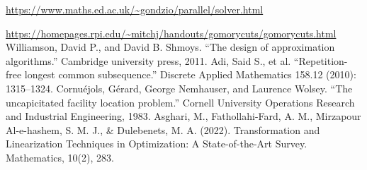 \documentclass[a4paper, utf8, 11pt, colorlinks]{book}
\theoremstyle{definition}
\begin{document}
\begin{thebibliography}{widest entry}
      \url{https://www.maths.ed.ac.uk/~gondzio/parallel/solver.html}
   
     \url{https://homepages.rpi.edu/~mitchj/handouts/gomorycuts/gomorycuts.html}
     Williamson, David P., and David B. Shmoys. ``The design of approximation algorithms.'' Cambridge university press, 2011.
     Adi, Said S., et al. ``Repetition-free longest common subsequence.'' Discrete Applied Mathematics 158.12 (2010): 1315--1324.
       Cornuéjols, Gérard, George Nemhauser, and Laurence Wolsey. ``The uncapicitated facility location problem.'' Cornell University Operations Research and Industrial Engineering, 1983.
     Asghari, M., Fathollahi-Fard, A. M., Mirzapour Al-e-hashem, S. M. J., \& Dulebenets, M. A. (2022). Transformation and Linearization Techniques in Optimization: A State-of-the-Art Survey. Mathematics, 10(2), 283.
\end{thebibliography}
\end{document}
